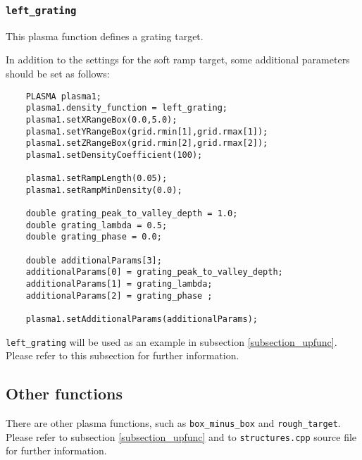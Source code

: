 \documentclass[11pt,a4paper]{report}
\begin{document}
\subsubsection{\texttt{left\_grating}}
This plasma function defines a grating target.

In addition to the settings for the soft ramp target, some additional parameters should be set as follows:
\begin{lstlisting}
	PLASMA plasma1;
	plasma1.density_function = left_grating;      
	plasma1.setXRangeBox(0.0,5.0);    
	plasma1.setYRangeBox(grid.rmin[1],grid.rmax[1]);                 
	plasma1.setZRangeBox(grid.rmin[2],grid.rmax[2]);
	plasma1.setDensityCoefficient(100);

	plasma1.setRampLength(0.05);
	plasma1.setRampMinDensity(0.0);
	     
	double grating_peak_to_valley_depth = 1.0;
	double grating_lambda = 0.5;
	double grating_phase = 0.0;
    
	double additionalParams[3];
	additionalParams[0] = grating_peak_to_valley_depth;
	additionalParams[1] = grating_lambda;
	additionalParams[2] = grating_phase ;
    
	plasma1.setAdditionalParams(additionalParams);
\end{lstlisting}
\verb+left_grating+ will be used as an example in subsection \ref{subsection_upfunc}. Please refer to this subsection for further information.


\subsection{Other functions}
There are other plasma functions, such as \texttt{box\_minus\_box} and \texttt{rough\_target}. Please refer to subsection \ref{subsection_upfunc} and to \verb+structures.cpp+ source file for further information.
\end{document}
